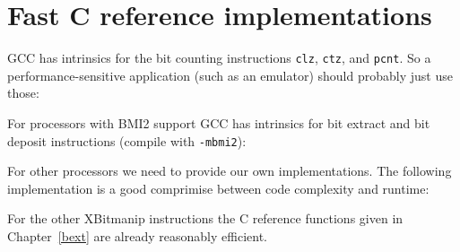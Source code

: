\chapter{Fast C reference implementations}
\label{fastc}

GCC has intrinsics for the bit counting instructions {\tt clz}, {\tt ctz}, and
{\tt pcnt}.  So a performance-sensitive application (such as an emulator)
should probably just use those:



For processors with BMI2 support GCC has intrinsics for bit extract and bit
deposit instructions (compile with {\tt -mbmi2}):



For other processors we need to provide our own implementations. The following
implementation is a good comprimise between code complexity and runtime:



For the other XBitmanip instructions the C reference functions given in Chapter~\ref{bext}
are already reasonably efficient.
